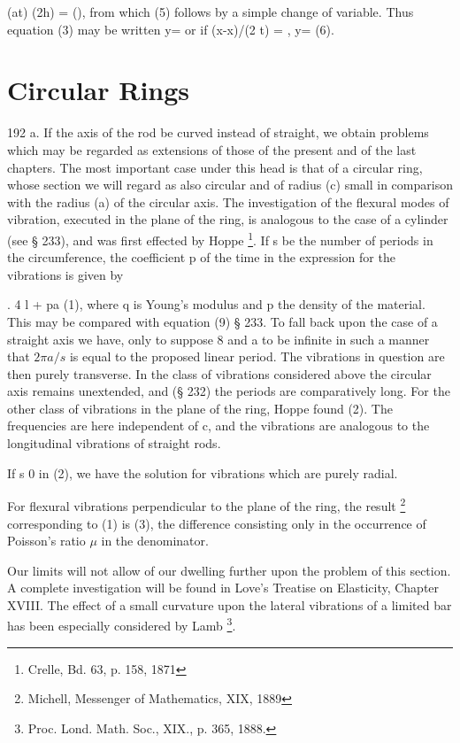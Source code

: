(at) (2h) = (),
from which (5) follows by a simple change of variable. Thus equation (3)
may be written
y=
or if (x-x)/(2 t) = ,
y= (6).

\section{Circular Rings} \label{sect:192a} 192 a.
If the axis of the rod be curved instead of straight, we obtain
problems which may be regarded as extensions of those of the present and
of the last chapters. The most important case under this head is
that of a circular ring, whose section we will regard as also circular
and of radius (c) small in comparison with the radius (a) of the
circular axis. The investigation of the flexural modes of vibration,
executed in the plane of the ring, is analogous to the case of a
cylinder (see § 233), and was first effected
by Hoppe \footnote{Crelle, Bd. 63, p. 158, 1871}. If s be the
number of periods in the circumference, the coefficient p of the time in
the expression for the vibrations is given by

. 4 l + pa (1),
where q is Young's modulus and p the density of the material.
This may be compared
with equation (9) § 233. To fall back upon the case of a straight axis
we have, only to suppose 8 and a to be infinite in such a manner that
\(2 \pi a/s\)
is equal to the proposed linear period. The vibrations in
question are then purely transverse. In the class of vibrations
considered above the circular axis remains unextended, and (§ 232) the
periods are comparatively long. For the other class of vibrations in the
plane of the ring, Hoppe found
(2).
The frequencies are here independent of c, and the vibrations are analogous
to the longitudinal vibrations of straight rods.

If s 0 in (2), we have the solution for vibrations which are purely
radial.

For flexural vibrations perpendicular to the plane of the ring, the
result \footnote{Michell, Messenger of Mathematics, XIX, 1889}
corresponding to (1) is (3), the difference consisting only in
the occurrence of Poisson's ratio
\(\mu \) in the denominator.

Our limits will not allow of our dwelling further upon the problem of
this section. A complete investigation will be found in Love's Treatise
on Elasticity, Chapter XVIII. The effect of a small curvature upon the
lateral vibrations of a limited bar has been especially considered by
Lamb \footnote{Proc. Lond. Math.  Soc., XIX., p. 365, 1888.}.
